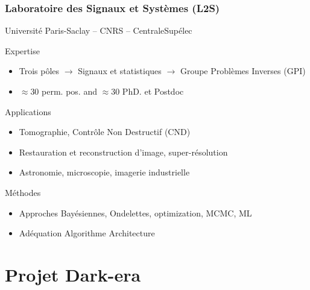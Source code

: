 \documentclass[usenames,dvipsnames]{beamer}
\begin{document}
\begin{frame}
  \frametitle{Laboratoire des Signaux et Systèmes (L2S)}

  \vfill %
  Université Paris-Saclay -- CNRS -- CentraleSupélec \vfill
  \vfill
  \begin{block}{Expertise}
      \begin{itemize}
      \item Trois pôles \(\rightarrow\) Signaux et statistiques \(\rightarrow\) Groupe Problèmes Inverses (GPI)
      \item \(\approx 30\) perm. pos. and \(\approx30\) PhD. et Postdoc
      \end{itemize}
  \end{block}
  \vfill
  \begin{block}{Applications}
    \begin{itemize}
    \item Tomographie, Contrôle Non Destructif (CND)
    \item Restauration et reconstruction d'image, super-résolution
    \item Astronomie, microscopie, imagerie industrielle
    \end{itemize}
  \end{block}
  \vfill
  \begin{block}{Méthodes}
    \begin{itemize}
    \item Approches Bayésiennes, Ondelettes, optimization, MCMC, ML
    \item Adéquation Algorithme Architecture
    \end{itemize}
  \end{block}
\end{frame}

\section{Projet Dark-era}
\end{document}
